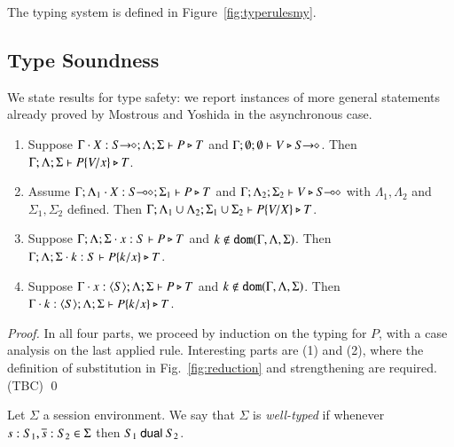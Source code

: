 

The typing system is defined in Figure~\ref{fig:typerulesmy}. 

\subsection{Type Soundness}
We state results for type safety:
we report instances of more general statements already proved by Mostrous and Yoshida in the asynchronous case.

\begin{lemma}
	\begin{enumerate}[1.]
		\item	Suppose $\Gamma \cdot X:S\!\! \rightarrow\!\! \diamond; \Lambda; \Sigma  \vdash P \triangleright T$ and
			$\Gamma; \emptyset ; \emptyset  \vdash V \triangleright S\!\! \rightarrow\!\! \diamond$.
			Then $\Gamma; \Lambda; \Sigma  \vdash P\{V/x \} \triangleright T$.
	 
		\item	Assume $\Gamma; \Lambda_1 \cdot X:S\!\! \multimap\!\! \diamond; \Sigma_1  \vdash P \triangleright T$ 
			and $\Gamma; \Lambda_2; \Sigma_2  \vdash V \triangleright S\!\! \multimap\!\! \diamond$ with 
			$\Lambda_1, \Lambda_2$ and $\Sigma_1, \Sigma_2$ defined.  
			Then $\Gamma; \Lambda_1 \cup \Lambda_2; \Sigma_1 \cup \Sigma_2  \vdash P\{V/X \} \triangleright T$.

		\item	Suppose $\Gamma; \Lambda; \Sigma \cdot x:S  \vdash P \triangleright T$ and
			$k \not\in \mathtt{dom}(\Gamma, \Lambda, \Sigma)$. 
			Then $\Gamma; \Lambda; \Sigma \cdot k:S  \vdash P\{k/x \} \triangleright T$.
			
		\item	Suppose $\Gamma \cdot x:\langle S \rangle; \Lambda; \Sigma \vdash P \triangleright T$ and
			$k \not\in \mathtt{dom}(\Gamma, \Lambda, \Sigma)$. 
			Then $\Gamma \cdot k:\langle S \rangle; \Lambda; \Sigma   \vdash P\{k/x \} \triangleright T$.
	\end{enumerate}
\end{lemma}

\begin{proof}
In all four parts, we proceed by induction on the typing for $P$, with a case analysis on the last applied rule. Interesting parts are (1) and (2), where the definition of substitution in Fig.~\ref{fig:reduction} and strengthening are required. (TBC)
\qed
\end{proof}

\begin{definition}
	Let $\Sigma$ a session environment.
	We say that $\Sigma$ is {\em well-typed} if whenever
	$s: S_1, \overline{s}: S_2 \in \Sigma$ then $S_1 \ \mathsf{dual}\  S_2$.
\end{definition}

